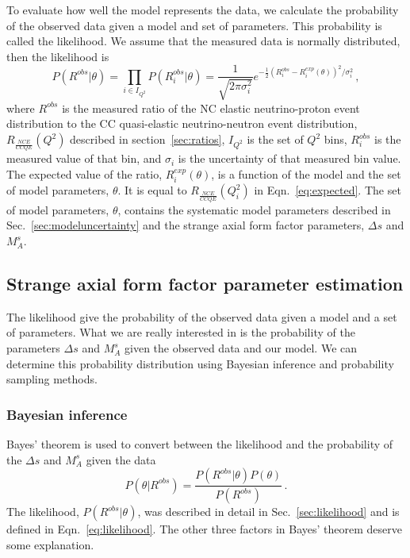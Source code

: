     To evaluate how well the model represents the data, we calculate the
    probability of the observed data given a model and set of parameters.  This
    probability is called the likelihood. We assume that the measured data is
    normally distributed, then the likelihood is
    \begin{equation}\label{eq:likelihood}
      P(R^{obs}|\theta) = \prod_{i\in I_{Q^2}} P(R^{obs}_i|\theta) = \frac{1}{\sqrt{2\pi \sigma_i^2}}
             e^{-\frac{1}{2}(R^{obs}_i - R^{exp}_i(\theta))^2/\sigma_i^2} \,,
    \end{equation}
    where $R^{obs}$ is the measured ratio of the NC elastic neutrino-proton
    event distribution to the CC quasi-elastic neutrino-neutron event
    distribution, $R_{\frac{NCE}{CCQE}}(Q^2)$ described in
    section~\ref{sec:ratios}, $I_{Q^2}$ is the set of $Q^2$ bins, $R^{obs}_i$
    is the measured value of that bin, and $\sigma_i$ is the uncertainty of
    that measured bin value. The expected value of the ratio,
    $R^{exp}_i(\theta)$, is a function of the model and the set of model
    parameters, $\theta$. It is equal to $R_{\frac{NCE}{CCQE}}(Q^2_i)$ in
    Eqn.~\ref{eq:expected}. The set of model parameters, $\theta$, contains the
    systematic model parameters described in Sec.~\ref{sec:modeluncertainty}
    and the strange axial form factor parameters, $\Delta s$ and $M_A^s$.
    

\subsection{Strange axial form factor parameter estimation}\label{sec:deltas}
  The likelihood give the probability of the observed data given a model and a
  set of parameters. What we are really interested in is the probability of the
  parameters $\Delta s$ and $M_A^s$ given the observed data and our model. We can
  determine this probability distribution using Bayesian inference and
  probability sampling methods.

  \subsubsection{Bayesian inference}
    Bayes' theorem is used to convert between the likelihood and the
    probability of the $\Delta s$ and $M_A^s$ given the data
    \begin{equation}
      P(\theta|R^{obs}) = \frac{P(R^{obs}|\theta)P(\theta)}{P(R^{obs})} \,.
    \end{equation}
    The likelihood, $P(R^{obs}|\theta)$, was described in detail in
    Sec.~\ref{sec:likelihood} and is defined in Eqn.~\ref{eq:likelihood}. The
    other three factors in Bayes' theorem deserve some explanation.
    
